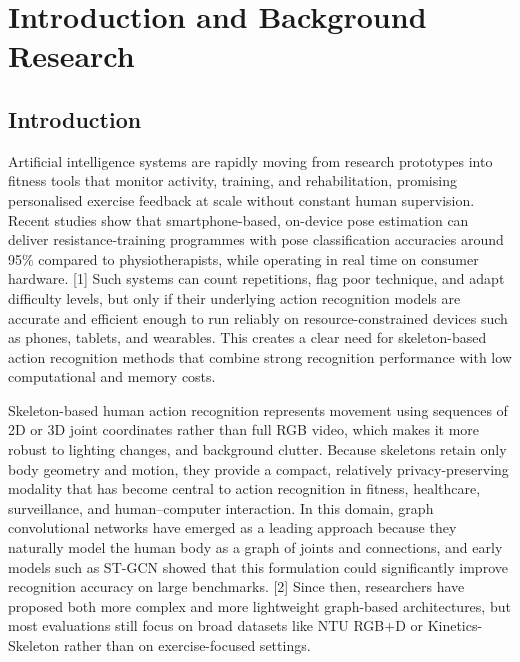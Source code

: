 \chapter{Introduction and Background Research}

\label{chapter1}

\section{Introduction}
Artificial intelligence systems are rapidly moving from research prototypes into fitness tools that monitor activity, training, and rehabilitation, promising personalised exercise feedback at scale without constant human supervision. Recent studies show that smartphone-based, on-device pose estimation can deliver resistance-training programmes with pose classification accuracies around 95\% compared to physiotherapists, while operating in real time on consumer hardware. [1] Such systems can count repetitions, flag poor technique, and adapt difficulty levels, but only if their underlying action recognition models are accurate and efficient enough to run reliably on resource-constrained devices such as phones, tablets, and wearables. This creates a clear need for skeleton-based action recognition methods that combine strong recognition performance with low computational and memory costs.

Skeleton-based human action recognition represents movement using sequences of 2D or 3D joint coordinates rather than full RGB video, which makes it more robust to lighting changes, and background clutter. Because skeletons retain only body geometry and motion, they provide a compact, relatively privacy-preserving modality that has become central to action recognition in fitness, healthcare, surveillance, and human–computer interaction. In this domain, graph convolutional networks have emerged as a leading approach because they naturally model the human body as a graph of joints and connections, and early models such as ST-GCN showed that this formulation could significantly improve recognition accuracy on large benchmarks. [2] Since then, researchers have proposed both more complex and more lightweight graph-based architectures, but most evaluations still focus on broad datasets like NTU RGB+D or Kinetics-Skeleton rather than on exercise-focused settings.


